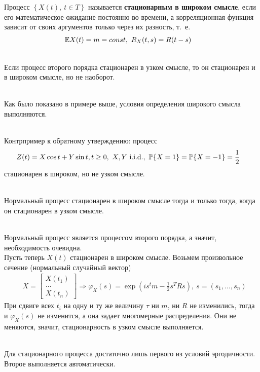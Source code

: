 \begin{Def}
    Процесс $\left\{ X(t), \ t \in T \right\}$ называется \textbf{стационарным в
      широком смысле}, если его математическое ожидание постоянно во времени, а
    корреляционная функция зависит от своих аргументов только через их разность, т.~е.
    \begin{align*}
      & \mathbb{E} X(t) = m = const, \ R_X(t,s) = R(t-s)
    \end{align*}
\end{Def}
\begin{Prop}
    ~
    \\
    Если процесс второго порядка стационарен в узком смысле, то он стационарен и
    в широком смысле, но не наоборот.
\end{Prop}
\begin{Proof}
    ~
    \\
    Как было показано в примере выше, условия определения широкого смысла выполняются.
\end{Proof}
\begin{example}
    ~
    \\
    Контрпример к обратному утверждению: процесс
    \begin{align*}
      & Z(t) = X\cos t + Y \sin t, t \geq 0, \ X,Y \ \text{i}.\text{i}.\text{d}., \ \mathbb{P}\{X = 1\} = \mathbb{P}\{X = -1\} = \frac{1}{2}
    \end{align*}
    стационарен в широком, но не узком смысле.
\end{example}
\begin{theorem}
    ~
    \\
    Нормальный процесс стационарен в широком смысле тогда и только тогда, когда
    он стационарен в узком смысле.
\end{theorem}
\begin{Proof}
    ~
    \\
    Нормальный процесс является процессом второго порядка, а значит,
    необходимость очевидна.
    \\
    Пусть теперь $X(t)$ стационарен в широком смысле. Возьмем произвольное
    сечение (нормальный случайный вектор)
    \begin{align*}
      & X = \left[ \begin{matrix}
              X(t_1) \\
              \dots \\
              X(t_n)
          \end{matrix} \right] \Rightarrow \varphi_X(s) = \exp \left( is^tm - \frac{1}{2}s^TRs \right), \ s = \left( s_1, \dots, s_n \right)
    \end{align*}
    При сдвиге всех $t_i$ на одну и ту же величину $\tau$ ни $m$, ни $R$ не
    изменились, тогда и $\varphi_X(s)$ не изменится, а она задает многомерные
    распределения. Они не меняются, значит, стационарность в узком смысле
    выполняется.
\end{Proof}
\begin{Note}
    ~
    \\
    Для стационарного процесса достаточно лишь первого из условий эргодичности.
    Второе выполняется автоматически.
\end{Note}
